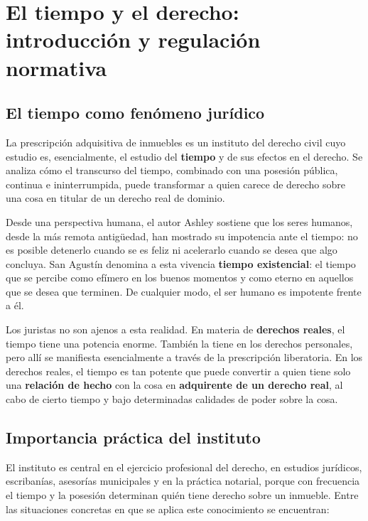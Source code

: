 \documentclass[12pt,oneside]{book}
\begin{document}
\chapter[El tiempo y el derecho]{El tiempo y el derecho: introducción y regulación normativa}

\section{El tiempo como fenómeno jurídico}

La prescripción adquisitiva de inmuebles es un instituto del derecho civil cuyo estudio es, esencialmente, el estudio del \textbf{tiempo} y de sus efectos en el derecho. Se analiza cómo el transcurso del tiempo, combinado con una posesión pública, continua e ininterrumpida, puede transformar a quien carece de derecho sobre una cosa en titular de un derecho real de dominio.

Desde una perspectiva humana, el autor Ashley sostiene que los seres humanos, desde la más remota antigüedad, han mostrado su impotencia ante el tiempo: no es posible detenerlo cuando se es feliz ni acelerarlo cuando se desea que algo concluya. San Agustín denomina a esta vivencia \textbf{tiempo existencial}: el tiempo que se percibe como efímero en los buenos momentos y como eterno en aquellos que se desea que terminen. De cualquier modo, el ser humano es impotente frente a él.

Los juristas no son ajenos a esta realidad. En materia de \textbf{derechos reales}, el tiempo tiene una potencia enorme. También la tiene en los derechos personales, pero allí se manifiesta esencialmente a través de la prescripción liberatoria. En los derechos reales, el tiempo es tan potente que puede convertir a quien tiene solo una \textbf{relación de hecho} con la cosa en \textbf{adquirente de un derecho real}, al cabo de cierto tiempo y bajo determinadas calidades de poder sobre la cosa.

\section{Importancia práctica del instituto}

El instituto es central en el ejercicio profesional del derecho, en estudios jurídicos, escribanías, asesorías municipales y en la práctica notarial, porque con frecuencia el tiempo y la posesión determinan quién tiene derecho sobre un inmueble. Entre las situaciones concretas en que se aplica este conocimiento se encuentran:
\end{document}
